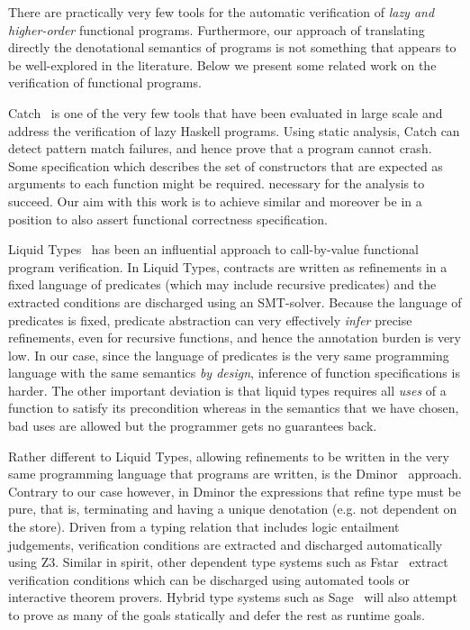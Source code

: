 There are practically very few tools for the automatic 
verification of {\em lazy and higher-order} functional programs.
Furthermore, our approach of translating directly the denotational semantics of 
programs is not something that appears to be well-explored in the literature. 
Below we present some related work on the verification of functional programs. 

Catch~\cite{Mitchell:2008:PBE:1411286.1411293} is one of the very few tools that 
have been evaluated in large scale and address the verification of lazy Haskell 
programs. Using static analysis, Catch can detect pattern match failures, and hence 
prove that a program cannot crash. Some specification which describes the set of 
constructors that are expected as arguments to each function might be required. 
necessary for the analysis to succeed. Our aim with this work is to achieve similar and
moreover be in a position to also assert functional correctness specification.

Liquid Types~\cite{Rondon:2008:LT:1375581.1375602} has been an influential 
approach to call-by-value functional program verification. In Liquid Types, 
contracts are written as refinements in a fixed language of predicates (which may 
include recursive predicates) and the extracted conditions are discharged using an 
SMT-solver. Because the language of predicates is fixed, predicate abstraction can 
very effectively {\em infer} precise refinements, even for recursive functions, and 
hence the annotation burden is very low. In our case, since the language of predicates
is the very same programming language with the same semantics {\em by design}, inference
of function specifications is harder. The other important deviation is that liquid types
requires all {\em uses} of a function to satisfy its precondition whereas in the semantics
that we have chosen, bad uses are allowed but the programmer gets no guarantees back.

Rather different to Liquid Types, allowing refinements to be written 
in the very same programming language that programs are written, is the 
Dminor~\cite{Bierman+:subtyping} approach. Contrary to our case however, in Dminor
the expressions that refine type must be pure, that is, terminating and having a unique
denotation (e.g. not dependent on the store). Driven from a typing relation that includes
logic entailment judgements, verification conditions are extracted and discharged automatically using Z3. 
Similar in spirit, other dependent type systems such 
as Fstar~\cite{fstar} extract verification conditions which can be discharged 
using automated tools 
or interactive theorem provers. Hybrid type systems such as Sage~\cite{Knowles+:sage}
will also attempt to prove as many of the goals statically and defer the rest as runtime
goals.

